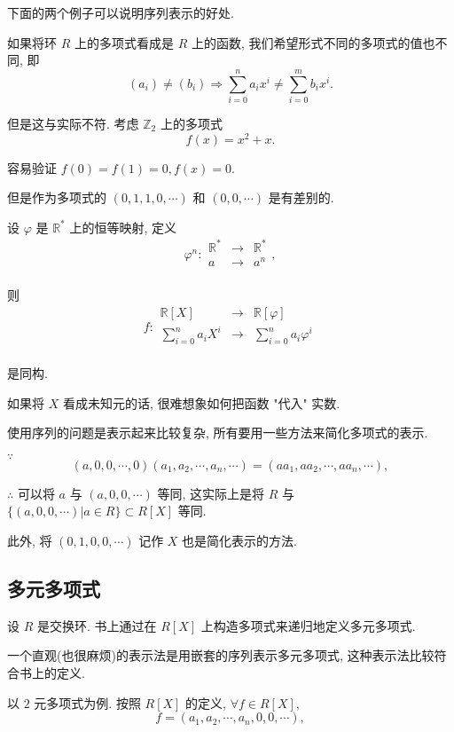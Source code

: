 \documentclass[UTF8]{ctexart}
\begin{document}
下面的两个例子可以说明序列表示的好处.
\begin{example}
    如果将环 $R$ 上的多项式看成是 $R$ 上的函数, 我们希望形式不同的多项式的值也不同, 即
    \[(a_i)\neq(b_i)\Rightarrow\sum\limits_{i=0}^{n}a_ix^i\neq\sum\limits_{i=0}^{m}b_ix^i.\]

    但是这与实际不符. 考虑 $\mathbb{Z}_2$ 上的多项式
    \[f(x)=x^2+x.\]

    容易验证 $f(0)=f(1)=0,f(x)=0$.

    但是作为多项式的 $(0,1,1,0,\cdots)$ 和 $(0,0,\cdots)$ 是有差别的.
\end{example}
\begin{example}
    设 $\varphi$ 是 $\mathbb{R}^*$ 上的恒等映射, 定义
    \[\varphi^n:\begin{array}{rcl}
        \mathbb{R}^* & \to & \mathbb{R}^* \\
        a & \to & a^n \\
    \end{array},\]

    则
    \[f:\begin{array}{rcl}
        \mathbb{R}[X] & \to & \mathbb{R}[\varphi] \\
        \sum\limits_{i=0}^{n}a_iX^i & \to & \sum\limits_{i=0}^{n}a_i\varphi^i \\
    \end{array}\]

    是同构.

    如果将 $X$ 看成未知元的话, 很难想象如何把函数 "代入" 实数.
\end{example}
使用序列的问题是表示起来比较复杂, 所有要用一些方法来简化多项式的表示.
\begin{example}
    $\because$
    \[(a,0,0,\cdots,0)(a_1,a_2,\cdots,a_n,\cdots)=(aa_1,aa_2,\cdots,aa_n,\cdots),\]

    $\therefore$ 可以将 $a$ 与 $(a,0,0,\cdots)$ 等同, 这实际上是将 $R$ 与 $\{(a,0,0,\cdots)|a\in R\}\subset R[X]$ 等同.
\end{example}
此外, 将 $(0,1,0,0,\cdots)$ 记作 $X$ 也是简化表示的方法.
\subsection{多元多项式}
设 $R$ 是交换环. 书上通过在 $R[X]$ 上构造多项式来递归地定义多元多项式.

一个直观(也很麻烦)的表示法是用嵌套的序列表示多元多项式, 这种表示法比较符合书上的定义.

以 $2$ 元多项式为例. 按照 $R[X]$ 的定义, $\forall f\in R[X]$,
\[f=(a_1,a_2,\cdots,a_n,0,0,\cdots),\]
\end{document}
